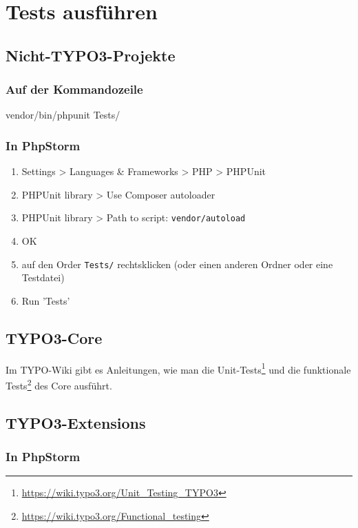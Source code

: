\documentclass[a4paper,11pt,headsepline]{scrartcl}
\begin{document}
\pagebreak
\section{Tests ausführen}

\subsection{Nicht-TYPO3-Projekte}

\subsubsection{Auf der Kommandozeile}

\begin{bashcode}
vendor/bin/phpunit Tests/
\end{bashcode}

\subsubsection{In PhpStorm}
\begin{enumerate}
  \item Settings > Languages \& Frameworks > PHP > PHPUnit
  \item PHPUnit library > Use Composer autoloader
  \item PHPUnit library > Path to script: \texttt{vendor/autoload}
  \item OK
  \item auf den Order \texttt{Tests/} rechtsklicken (oder einen anderen Ordner oder eine Testdatei)
  \item Run 'Tests'
\end{enumerate}


\subsection{TYPO3-Core}

Im TYPO-Wiki gibt es Anleitungen, wie man die Unit-Tests\footnote{\url{https://wiki.typo3.org/Unit_Testing_TYPO3}} und die funktionale Tests\footnote{\url{https://wiki.typo3.org/Functional_testing}} des Core ausführt.


\subsection{TYPO3-Extensions}

\subsubsection{In PhpStorm}
\end{document}
